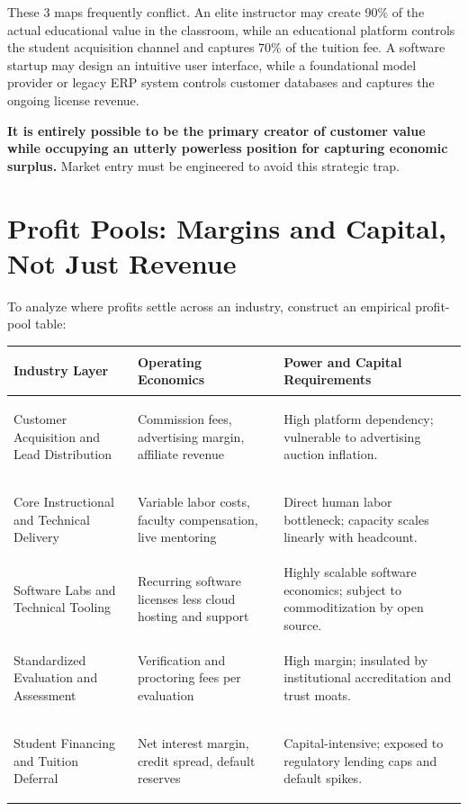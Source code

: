 These 3 maps frequently conflict. An elite instructor may create 90\% of the actual educational value in the classroom, while an educational platform controls the student acquisition channel and captures 70\% of the tuition fee. A software startup may design an intuitive user interface, while a foundational model provider or legacy ERP system controls customer databases and captures the ongoing license revenue.

\textbf{It is entirely possible to be the primary creator of customer value while occupying an utterly powerless position for capturing economic surplus.} Market entry must be engineered to avoid this strategic trap.

\section{Profit Pools: Margins and Capital, Not Just Revenue}

To analyze where profits settle across an industry, construct an empirical profit-pool table:

\begin{tcolorbox}[
  enhanced,
  colback=BayesSurface!60,
  colframe=BayesBorder,
  boxrule=0.5pt,
  arc=3pt,
  left=3pt,right=3pt,top=3pt,bottom=3pt,
  boxsep=1pt
]
\scriptsize
\begin{tabularx}{\linewidth}{>{\bfseries\raggedright\arraybackslash}p{2.2cm} >{\raggedright\arraybackslash}p{2.3cm} X}
\toprule
\textbf{Industry Layer} & \textbf{Operating Economics} & \textbf{Power and Capital Requirements} \\
\midrule
Customer Acquisition and Lead Distribution & Commission fees, advertising margin, affiliate revenue & High platform dependency; vulnerable to advertising auction inflation. \\
\addlinespace[2pt]
Core Instructional and Technical Delivery & Variable labor costs, faculty compensation, live mentoring & Direct human labor bottleneck; capacity scales linearly with headcount. \\
\addlinespace[2pt]
Software Labs and Technical Tooling & Recurring software licenses less cloud hosting and support & Highly scalable software economics; subject to commoditization by open source. \\
\addlinespace[2pt]
Standardized Evaluation and Assessment & Verification and proctoring fees per evaluation & High margin; insulated by institutional accreditation and trust moats. \\
\addlinespace[2pt]
Student Financing and Tuition Deferral & Net interest margin, credit spread, default reserves & Capital-intensive; exposed to regulatory lending caps and default spikes. \\
\bottomrule
\end{tabularx}
\end{tcolorbox}

